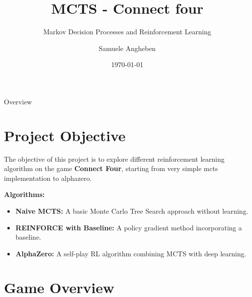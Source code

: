 \documentclass[aspectratio=169,xcolor=dvipsnames]{beamer}
\title{MCTS - Connect four}
\subtitle{Markov Decision Processes and Reinforcement Learning}
\author{Samuele Angheben}
\institute
{
    Trento University %
}
\date{\today} %
\begin{document}
\begin{frame}
    \titlepage
\end{frame}

\begin{frame}{Overview}
    \tableofcontents
\end{frame}

\section{Project Objective}

\begin{frame}{}
The objective of this project is to explore different reinforcement learning algorithm on the game \textbf{Connect Four}, starting from very simple mcts implementation to alphazero. 

\medskip
\medskip
\medskip
\textbf{Algorithms:}
\begin{itemize}
    \item \textbf{Naive MCTS:} A basic Monte Carlo Tree Search approach without learning.
    \item \textbf{REINFORCE with Baseline:} A policy gradient method incorporating a baseline.
    \item \textbf{AlphaZero:} A self-play RL algorithm combining MCTS with deep learning.
\end{itemize}
\end{frame}


\section{Game Overview}
\end{document}
